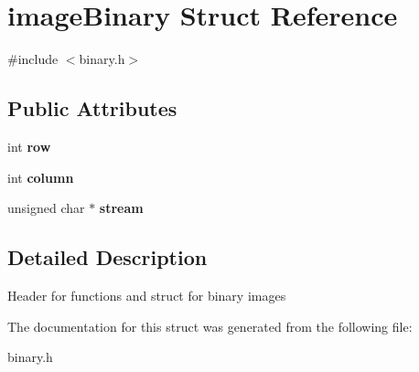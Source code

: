 \hypertarget{structimageBinary}{}\section{image\+Binary Struct Reference}
\label{structimageBinary}


{\ttfamily \#include $<$binary.\+h$>$}

\subsection*{Public Attributes}
\begin{DoxyCompactItemize}
\item 
\mbox{\label{structimageBinary_abdfc9ba7108a118f3d2bede8480067b1}} 
int {\bfseries row}
\item 
\mbox{\label{structimageBinary_a2a4c018ca3e95bf500b3f480ed24eb1c}} 
int {\bfseries column}
\item 
\mbox{\label{structimageBinary_a8e6618844a6b7954f842186671611fd2}} 
unsigned char $\ast$ {\bfseries stream}
\end{DoxyCompactItemize}


\subsection{Detailed Description}
Header for functions and struct for binary images 

The documentation for this struct was generated from the following file\+:\begin{DoxyCompactItemize}
\item 
binary.\+h\end{DoxyCompactItemize}
